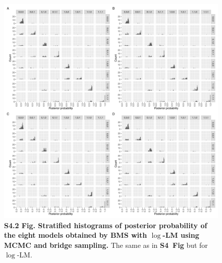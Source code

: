 \documentclass[11pt]{article}
\newcommand{\sfighistmcmcnl}{\textbf{S4~Fig}\xspace}
\begin{document}
\begin{figure}[!ht]
\begin{center}
  \includegraphics[width=1\textwidth]{png/sim_hist_mcmc_bs_lm.png}
\end{center}  
\caption{
  {\bf
    S4.2 Fig.
    Stratified histograms of posterior probability of the eight models obtained by BMS with $\log$-LM using MCMC and bridge sampling.}
The same as in \sfighistmcmcnl but for $\log$-LM.
}
\label{s-fig:sim-hist-mcmc-lm}
\end{figure}
\end{document}
